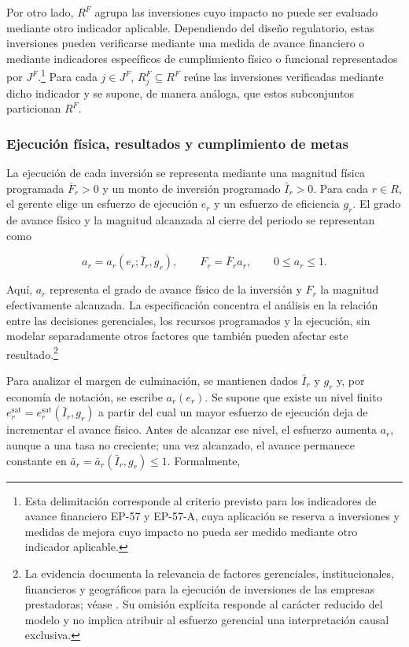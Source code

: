 Por otro lado, \(R^{F}\) agrupa las inversiones cuyo impacto no puede ser evaluado mediante otro indicador aplicable. Dependiendo del diseño regulatorio, estas inversiones pueden verificarse mediante una medida de avance financiero o mediante indicadores específicos de cumplimiento físico o funcional representados por \(J^{F}\).\footnote{Esta delimitación corresponde al criterio previsto para los indicadores de avance financiero EP-57 y EP-57-A, cuya aplicación se reserva a inversiones y medidas de mejora cuyo impacto no pueda ser medido mediante otro indicador aplicable.} Para cada \(j\in J^{F}\), \(R_j^{F}\subseteq R^{F}\) reúne las inversiones verificadas mediante dicho indicador y se supone, de manera análoga, que estos subconjuntos particionan \(R^{F}\).

\subsubsection{Ejecución física, resultados y cumplimiento de metas}

La ejecución de cada inversión se representa mediante una magnitud física programada \(\bar F_r>0\) y un monto de inversión programado \(\bar I_r>0\). Para cada \(r\in R\), el gerente elige un esfuerzo de ejecución \(e_r\) y un esfuerzo de eficiencia \(g_r\). El grado de avance físico y la magnitud alcanzada al cierre del periodo se representan como

\begin{equation}
\label{eq:ejecucion_fisica}
a_r
=
a_r(e_r;\bar I_r,g_r),
\qquad
F_r
=
\bar F_r a_r,
\qquad
0
\leq
a_r
\leq
1.
\end{equation}

Aquí, \(a_r\) representa el grado de avance físico de la inversión y \(F_r\) la magnitud efectivamente alcanzada. La especificación concentra el análisis en la relación entre las decisiones gerenciales, los recursos programados y la ejecución, sin modelar separadamente otros factores que también pueden afectar este resultado.\footnote{La evidencia documenta la relevancia de factores gerenciales, institucionales, financieros y geográficos para la ejecución de inversiones de las empresas prestadoras; véase \citet{escobar2025determinantes}. Su omisión explícita responde al carácter reducido del modelo y no implica atribuir al esfuerzo gerencial una interpretación causal exclusiva.}

Para analizar el margen de culminación, se mantienen dados \(\bar I_r\) y \(g_r\) y, por economía de notación, se escribe \(a_r(e_r)\). Se supone que existe un nivel finito \(e_r^{\mathrm{sat}}=e_r^{\mathrm{sat}}(\bar I_r,g_r)\) a partir del cual un mayor esfuerzo de ejecución deja de incrementar el avance físico. Antes de alcanzar ese nivel, el esfuerzo aumenta \(a_r\), aunque a una tasa no creciente; una vez alcanzado, el avance permanece constante en \(\bar a_r=\bar a_r(\bar I_r,g_r)\leq1\). Formalmente,


